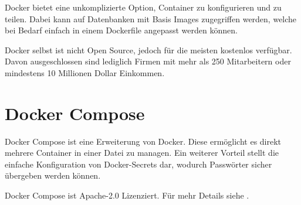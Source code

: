 Docker bietet eine unkomplizierte Option, Container zu konfigurieren und zu teilen.
Dabei kann auf Datenbanken mit Basis Images zugegriffen werden, welche bei Bedarf
einfach in einem Dockerfile angepasst werden können.

Docker selbst ist nicht Open Source, jedoch für die meisten kostenlos verfügbar.
Davon ausgeschlossen sind lediglich Firmen mit mehr als 250 Mitarbeitern oder mindestens 10 Millionen Dollar Einkommen.

\section{Docker Compose}\label{sec:docker-compose}

Docker Compose ist eine Erweiterung von Docker.
Diese ermöglicht es direkt mehrere Container in einer Datei zu managen.
Ein weiterer Vorteil stellt die einfache Konfiguration von Docker-Secrets dar, wodurch \ua Passwörter sicher übergeben werden können.

Docker Compose ist Apache-2.0 Lizenziert.
Für mehr Details siehe .

